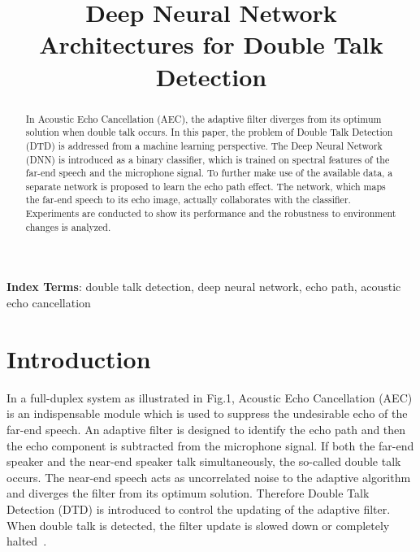 \documentclass[a4paper]{article}
\title{Deep Neural Network Architectures for Double Talk Detection \\}
\begin{document}
\maketitle
%
\begin{abstract}
  In Acoustic Echo Cancellation (AEC), the adaptive filter diverges from its optimum solution when double talk occurs. In this paper, the problem of Double Talk Detection (DTD) is addressed from a machine learning perspective. The Deep Neural Network (DNN) is introduced as a binary classifier, which is trained on spectral features of the far-end speech and the microphone signal. To further make use of the available data, a separate network is proposed to learn the echo path effect. The network, which maps the far-end speech to its echo image, actually collaborates with the classifier. Experiments are conducted to show its performance and the robustness to environment changes is analyzed.
\end{abstract}
\noindent\textbf{Index Terms}: double talk detection, deep neural network, echo path, acoustic echo cancellation

\section{Introduction}

In a full-duplex system as illustrated in Fig.1, Acoustic Echo Cancellation (AEC) is an indispensable module which is used to suppress the undesirable echo of the far-end speech. An adaptive filter is designed to identify the echo path and then the echo component is subtracted from the microphone signal. If both the far-end speaker and the near-end speaker talk simultaneously, the so-called double talk occurs. The near-end speech acts as uncorrelated noise to the adaptive algorithm and diverges the filter from its optimum solution. Therefore Double Talk Detection (DTD) is introduced to control the updating of the adaptive filter. When double talk is detected, the filter update is slowed down or completely halted~\cite{benesty2011double}.
\end{document}
